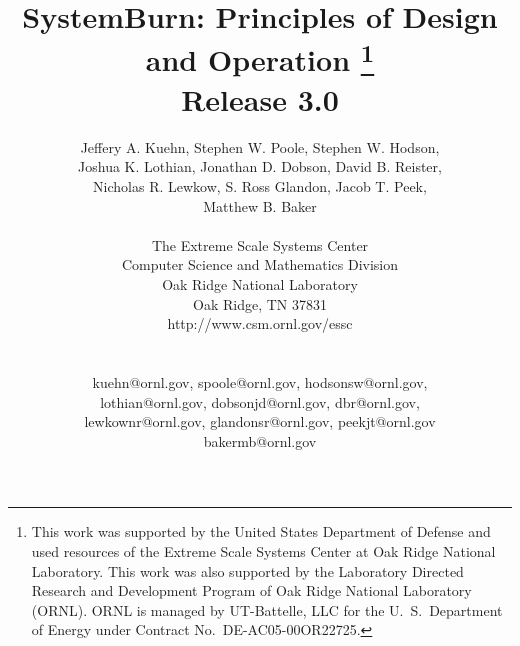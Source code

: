 \title{
	SystemBurn: Principles of Design and Operation
	\footnote{
		This work was supported by the United States Department of Defense and used resources of the
		Extreme Scale Systems Center at Oak Ridge National Laboratory.
		This work was also supported by the Laboratory Directed Research and
		Development Program of Oak Ridge National Laboratory (ORNL). ORNL is managed by UT-Battelle,
		LLC for the U.~S.~Department of Energy under Contract No.~DE-AC05-00OR22725.
	} \\
	Release 3.0\\
}

\author{
Jeffery A. Kuehn, Stephen W. Poole, Stephen W. Hodson,\\
Joshua K. Lothian, Jonathan D. Dobson, David B. Reister, \\
Nicholas R. Lewkow, S. Ross Glandon, Jacob T. Peek, \\
Matthew B. Baker \\
\\
The Extreme Scale Systems Center \\
Computer Science and Mathematics Division \\
Oak Ridge National Laboratory \\
Oak Ridge, TN 37831 \\
http://www.csm.ornl.gov/essc\\
\\
\\
kuehn@ornl.gov, spoole@ornl.gov, hodsonsw@ornl.gov,\\
lothian@ornl.gov, dobsonjd@ornl.gov, dbr@ornl.gov, \\
lewkownr@ornl.gov, glandonsr@ornl.gov, peekjt@ornl.gov\\
bakermb@ornl.gov \\
}
\maketitle
